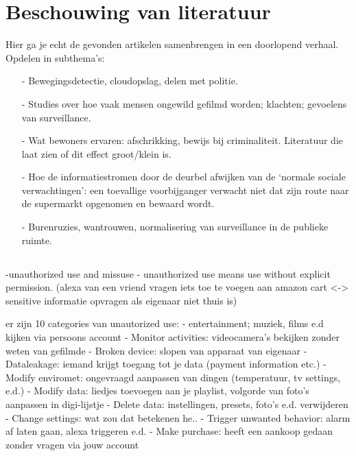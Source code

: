 \documentclass[nonacm,sigconf]{acmart}
\begin{document}
    \section{Beschouwing van literatuur}
    Hier ga je echt de gevonden artikelen samenbrengen in een doorlopend verhaal.
    Opdelen in subthema’s:

    \begin{itemize}[leftmargin = *,listparindent =1cm]
        \item[-] Bewegingsdetectie, cloudopslag, delen met politie.
        \item[-] Studies over hoe vaak mensen ongewild gefilmd worden; klachten; gevoelens van surveillance.
        \item[-] Wat bewoners ervaren: afschrikking, bewijs bij criminaliteit. Literatuur die laat zien of dit effect groot/klein is.
        \item[-] Hoe de informatiestromen door de deurbel afwijken van de ‘normale sociale verwachtingen’: een toevallige voorbijganger verwacht niet dat zijn route naar de supermarkt opgenomen en bewaard wordt.
        \item[-] Burenruzies, wantrouwen, normalisering van surveillance in de publieke ruimte.
    \end{itemize}

    \subsection{}
    \parencite{moh2023characterizing}


    -unauthorized use and missuse
    - unauthorized use means use without explicit permission. (alexa van een vriend vragen iets toe te voegen aan amazon cart <-> sensitive informatie opvragen als eigenaar niet thuis is)


    er zijn 10 categories van unautorized use:
    - entertainment; muziek, films e.d kijken via persoons account
    - Monitor activities: videocamera's bekijken zonder weten van gefilmde
    - Broken device: slopen van apparaat van eigenaar
    - Dataleakage: iemand krijgt toegang tot je data (payment information etc.)
    - Modify enviromet: ongevraagd aanpassen van dingen (temperatuur, tv settings, e.d.)
    - Modify data: liedjes toevoegen aan je playlist, volgorde van foto's aanpassen in digi-lijstje
    - Delete data: instellingen, presets, foto's e.d. verwijderen
    - Change settings: wat zou dat betekenen he..
    - Trigger unwanted behavior: alarm af laten gaan, alexa triggeren e.d.
    - Make purchase: heeft een aankoop gedaan zonder vragen via jouw account
\end{document}
